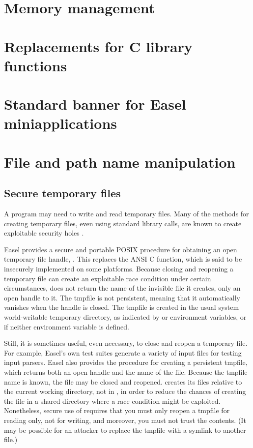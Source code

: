 \section{Memory management}


\section{Replacements for C library functions}


\section{Standard banner for Easel miniapplications}


\section{File and path name manipulation}


\subsection{Secure temporary files}

A program may need to write and read temporary files.  Many of the
methods for creating temporary files, even using standard library
calls, are known to create exploitable security holes
\citep{Wheeler03,ChenDeanWagner04}.

Easel provides a secure and portable POSIX procedure for obtaining an
open temporary file handle, . This replaces the
ANSI C  function, which is said to be insecurely
implemented on some platforms.  Because closing and reopening a
temporary file can create an exploitable race condition under certain
circumstances,  does not return the name of the
invisible file it creates, only an open  handle to
it. The tmpfile is not persistent, meaning that it automatically
vanishes when the  handle is closed. The tmpfile is
created in the usual system world-writable temporary directory, as
indicated by  or  environment variables, or
 if neither environment variable is defined.

Still, it is sometimes useful, even necessary, to close and reopen a
temporary file. For example, Easel's own test suites generate a
variety of input files for testing input parsers.  Easel also provides
the  procedure for creating a persistent
tmpfile, which returns both an open  handle and the
name of the file. Because the tmpfile name is known, the file may be
closed and reopened.   creates its files
relative to the current working directory, not in , in
order to reduce the chances of creating the file in a shared directory
where a race condition might be exploited. Nonetheless, secure use of
 requires that you must only reopen a
tmpfile for reading only, not for writing, and moreover, you must not
trust the contents.  (It may be possible for an attacker to replace
the tmpfile with a symlink to another file.)

